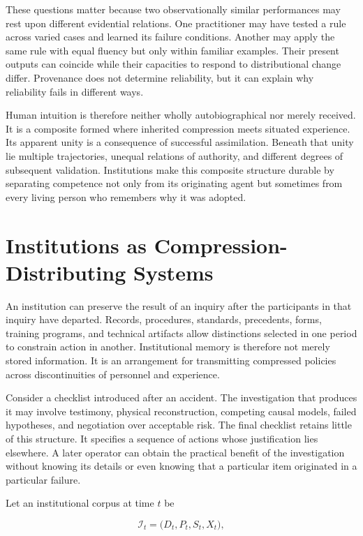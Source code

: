\documentclass[11pt]{article}
\begin{document}
These questions matter because two observationally similar performances may rest upon different evidential relations. One practitioner may have tested a rule across varied cases and learned its failure conditions. Another may apply the same rule with equal fluency but only within familiar examples. Their present outputs can coincide while their capacities to respond to distributional change differ. Provenance does not determine reliability, but it can explain why reliability fails in different ways.

Human intuition is therefore neither wholly autobiographical nor merely received. It is a composite formed where inherited compression meets situated experience. Its apparent unity is a consequence of successful assimilation. Beneath that unity lie multiple trajectories, unequal relations of authority, and different degrees of subsequent validation. Institutions make this composite structure durable by separating competence not only from its originating agent but sometimes from every living person who remembers why it was adopted.

\section{Institutions as Compression-Distributing Systems}

An institution can preserve the result of an inquiry after the participants in that inquiry have departed. Records, procedures, standards, precedents, forms, training programs, and technical artifacts allow distinctions selected in one period to constrain action in another. Institutional memory is therefore not merely stored information. It is an arrangement for transmitting compressed policies across discontinuities of personnel and experience.

Consider a checklist introduced after an accident. The investigation that produces it may involve testimony, physical reconstruction, competing causal models, failed hypotheses, and negotiation over acceptable risk. The final checklist retains little of this structure. It specifies a sequence of actions whose justification lies elsewhere. A later operator can obtain the practical benefit of the investigation without knowing its details or even knowing that a particular item originated in a particular failure.

Let an institutional corpus at time $t$ be

\[
\mathcal{I}_t
=
\bigl(
D_t,P_t,S_t,X_t
\bigr),
\]
\end{document}
